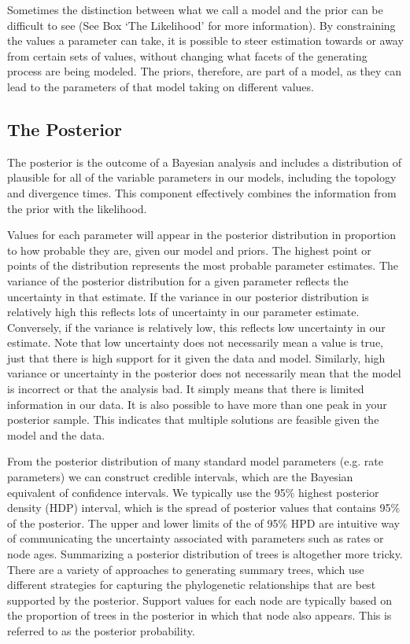 Sometimes the distinction between what we call a model and the prior can be difficult to see (See Box `The Likelihood' for more information).
By constraining the values a parameter can take, it is possible to steer estimation towards or away from certain sets of values, without changing what facets of the generating process are being modeled. 
The priors, therefore, are part of a model, as they can lead to the parameters of that model taking on different values.

\subsection{The Posterior}

The posterior is the outcome of a Bayesian analysis and includes a distribution of plausible for all of the variable parameters in our models, including the topology and divergence times.
This component effectively combines the information from the prior with the likelihood. %

Values for each parameter will appear in the posterior distribution in proportion to how probable they are, given our model and priors.
The highest point or points of the distribution represents the most probable parameter estimates.
The variance of the posterior distribution for a given parameter reflects the uncertainty in that estimate.
If the variance in our posterior distribution is relatively high this reflects lots of uncertainty in our parameter estimate.
Conversely, if the variance is relatively low, this reflects low uncertainty in our estimate.
Note that low uncertainty does not necessarily mean a value is true, just that there is high support for it given the data and model.
Similarly, high variance or uncertainty in the posterior does not necessarily mean that the model is incorrect or that the analysis bad. It simply means that there is limited information in our data.
It is also possible to have more than one peak in your posterior sample.
This indicates that multiple solutions are feasible given the model and the data.

From the posterior distribution of many standard model parameters (e.g. rate parameters) we can construct credible intervals, which are the Bayesian equivalent of confidence intervals.  
We typically use the 95\% highest posterior density (HDP) interval, which is the spread of posterior values that contains 95\% of the posterior.
The upper and lower limits of the of 95\% HPD are intuitive way of communicating the uncertainty associated with parameters such as rates or node ages.
Summarizing a posterior distribution of trees is altogether more tricky.
There are a variety of approaches to generating summary trees, which use different strategies for capturing the phylogenetic relationships that are best supported by the posterior.
Support values for each node are typically based on the proportion of trees in the posterior in which that node also appears. 
This is referred to as the posterior probability. 

